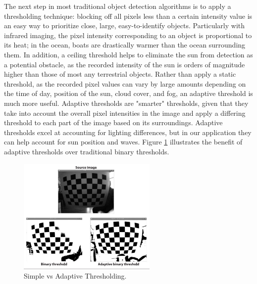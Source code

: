 The next step in most traditional object detection algorithms is to apply a thresholding technique: blocking off all pixels less than a certain intensity value is an easy way to prioritize close, large, easy-to-identify objects. Particularly with infrared imaging, the pixel intensity corresponding to an object is proportional to its heat; in the ocean, boats are drastically warmer than the ocean surrounding them. In addition, a ceiling threshold helps to eliminate the sun from detection as a potential obstacle, as the recorded intensity of the sun is orders of magnitude higher than those of most any terrestrial objects. Rather than apply a static threshold, as the recorded pixel values can vary by large amounts depending on the time of day, position of the sun, cloud cover, and fog, an adaptive threshold is much more useful. Adaptive thresholds are "smarter" thresholds, given that they take into account the overall pixel intensities in the image and apply a differing threshold to each part of the image based on its surroundings. Adaptive thresholds excel at accounting for lighting differences, but in our application they can help account for sun position and waves. Figure \ref{fig:thresh_comp} illustrates the benefit of adaptive thresholds over traditional binary thresholds.

\begin{figure}
\centering
\includegraphics[width=0.6\textwidth]{"./image/threshold_comparisons"}
\caption{Simple vs Adaptive Thresholding.}
\label{fig:thresh_comp}
\end{figure}

